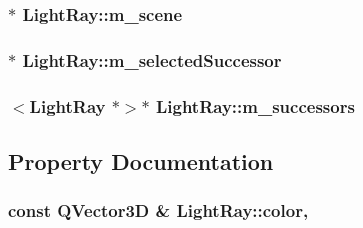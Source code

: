 \subsubsection[{m\+\_\+scene}]{$\ast$ Light\+Ray\+::m\+\_\+scene\hspace{0.3cm}{\ttfamily [protected]}}\label{class_light_ray_a9f99d6386ed92c979889f38b5348d628}
\hypertarget{class_light_ray_a9e430528b861007696716fbd054c9de3}{}
\subsubsection[{m\+\_\+selected\+Successor}]{$\ast$ Light\+Ray\+::m\+\_\+selected\+Successor\hspace{0.3cm}{\ttfamily [protected]}}\label{class_light_ray_a9e430528b861007696716fbd054c9de3}
\hypertarget{class_light_ray_a669e04446c77fc44bee41146c1883356}{}
\subsubsection[{m\+\_\+successors}]{$<${\bf Light\+Ray} $\ast$$>$$\ast$ Light\+Ray\+::m\+\_\+successors\hspace{0.3cm}{\ttfamily [protected]}}\label{class_light_ray_a669e04446c77fc44bee41146c1883356}


\subsection{Property Documentation}
\hypertarget{class_light_ray_ad03c134ce8b910618409f74d1267ff9b}{}
\subsubsection[{color}]{\setlength{\rightskip}{0pt plus 5cm}const Q\+Vector3\+D \& Light\+Ray\+::color\hspace{0.3cm}{\ttfamily [read]}, {\ttfamily [write]}}\label{class_light_ray_ad03c134ce8b910618409f74d1267ff9b}
\hypertarget{class_light_ray_a001a750a7d287ce54dd1772aa18be6c7}{}
